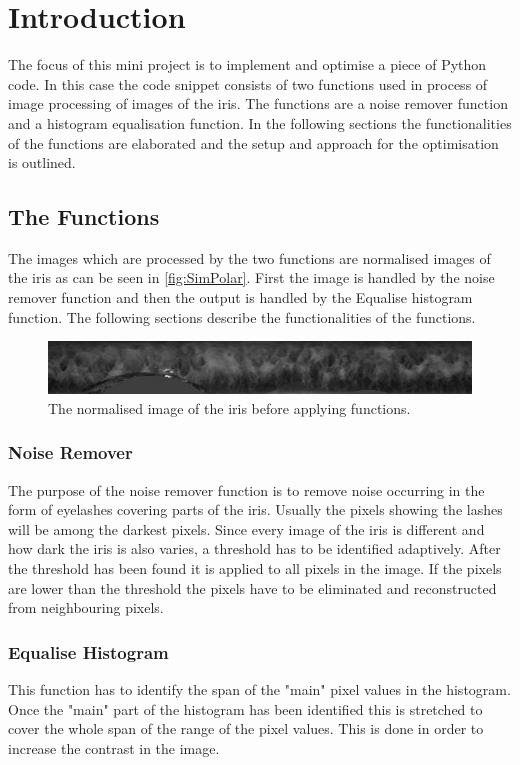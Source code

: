 \chapter{Introduction}
The focus of this mini project is to implement and optimise a piece of Python code. 
In this case the code snippet consists of two functions used in process of image processing of images of the iris. The functions are a noise remover function and a histogram equalisation function. In the following sections the functionalities of the functions are elaborated and the setup and approach for the optimisation is outlined. 

\section{The Functions}
\label{sec:The_Functions}
The images which are processed by the two functions are normalised images of the iris as can be seen in \autoref{fig:SimPolar}. First the image is handled by the noise remover function and then the output is handled by the Equalise histogram function. The following sections describe the functionalities of the functions. 
\begin{figure}[h]
\centering
\includegraphics[width=\textwidth]{figures/002polar.jpg}
\caption{The normalised image of the iris before applying functions.}
\label{fig:SimPolar}
\end{figure}


\subsection{Noise Remover}
The purpose of the noise remover function is to remove noise occurring in the form of eyelashes covering parts of the iris. Usually the pixels showing the lashes will be among the darkest pixels. Since every image of the iris is different and how dark the iris is also varies, a threshold has to be identified adaptively. After the threshold has been found it is applied to all pixels in the image. If the pixels are lower than the threshold the pixels have to be eliminated and reconstructed from neighbouring pixels.
  
\subsection{Equalise Histogram}
This function has to identify the span of the "main" pixel values in the histogram. Once the "main" part of the  histogram has been identified this is stretched to cover the whole span of the range of the pixel values. This is done in order to increase the contrast in the image.  

